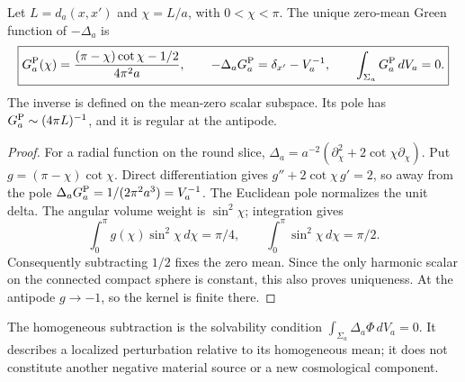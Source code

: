 \documentclass[12pt,a4paper]{article}
\begin{document}
\begin{proposition}
\label{p8:prop:v2204-compact-poisson-green}
Let $L=d_a(x,x')$ and $\chi=L/a$, with $0<\chi<\pi$. The unique zero-mean
Green function of $-\Delta_a$ is
\begin{equation}
\label{p8:eq:v2204-compact-poisson-green}
 \boxed{G_a^{\rm P}(\chi)
 =\frac{(\pi-\chi)\cot\chi-1/2}{4\pi^2a},\qquad
 -\Delta_aG_a^{\rm P}=\delta_{x'}-V_a^{-1},\qquad
 \int_{\Sigma_a}G_a^{\rm P}\,dV_a=0.}
\end{equation}
The inverse is defined on the mean-zero scalar subspace. Its pole has
$G_a^{\rm P}\sim(4\pi L)^{-1}$, and it is regular at the antipode.
\end{proposition}
\begin{proof}
For a radial function on the round slice,
$\Delta_a=a^{-2}(\partial_\chi^2+2\cot\chi\partial_\chi)$.
Put $g=(\pi-\chi)\cot\chi$. Direct differentiation gives
$g''+2\cot\chi\,g'=2$, so away from the pole
$\Delta_aG_a^{\rm P}=1/(2\pi^2a^3)=V_a^{-1}$.
The Euclidean pole normalizes the unit delta. The angular volume weight is
$\sin^2\chi$; integration gives
\[
 \int_0^\pi g(\chi)\sin^2\chi\,d\chi=\pi/4,
 \qquad \int_0^\pi\sin^2\chi\,d\chi=\pi/2.
\]
Consequently subtracting $1/2$ fixes the zero mean. Since the only harmonic
scalar on the connected compact sphere is constant, this also proves
uniqueness. At the antipode $g\to-1$, so the kernel is finite there.
\end{proof}

The homogeneous subtraction is the solvability condition
$\int_{\Sigma_a}\Delta_a\Phi\,dV_a=0$. It describes a localized perturbation
relative to its homogeneous mean; it does not constitute another negative
material source or a new cosmological component.
\end{document}
